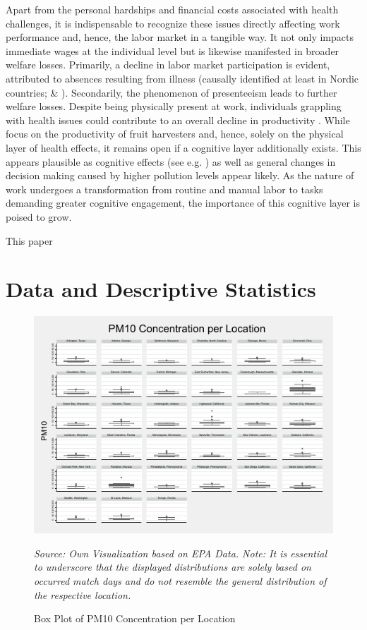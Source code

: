 \documentclass[12pt,a4paper]{article}
\begin{document}
Apart from the personal hardships and financial costs associated with health challenges, it is indispensable to recognize these issues directly affecting work performance and, hence, the labor market in a tangible way. It not only impacts immediate wages at the individual level but is likewise manifested in broader welfare losses. Primarily, a decline in labor market participation is evident, attributed to absences resulting from illness (causally identified at least in Nordic countries; \citealp{hansen2000} \& \citealp{jans2018}). Secondarily, the phenomenon of presenteeism leads to further welfare losses. Despite being physically present at work, individuals grappling with health issues could contribute to an overall decline in productivity \citep{zivin2012}. While \citet{zivin2012} focus on the productivity of fruit harvesters and, hence, solely on the physical layer of health effects, it remains open if a cognitive layer additionally exists. This appears plausible as cognitive effects (see e.g. \citealp{schikowski2015,tonne2014,ranft2009}) as well as general changes in decision making \citep{archsmith2018} caused by higher pollution levels appear likely. As the nature of work undergoes a transformation from routine and manual labor to tasks demanding greater cognitive engagement, the importance of this cognitive layer
is poised to grow.

This paper
\clearpage
\section{Data and Descriptive Statistics}
\begin{figure}[h]
	\center
	\includegraphics[scale=1.7]{../05_Figures/PM10_Concentration_per_Place.pdf}
	\caption*{\footnotesize \textit{Source: Own Visualization based on EPA Data. Note: It is essential to underscore that the displayed distributions are solely based on occurred match days and do not resemble the general distribution of the respective location.}}
	\caption{Box Plot of PM10 Concentration per Location}
	\label{F:1}
\end{figure}
\clearpage
\end{document}
